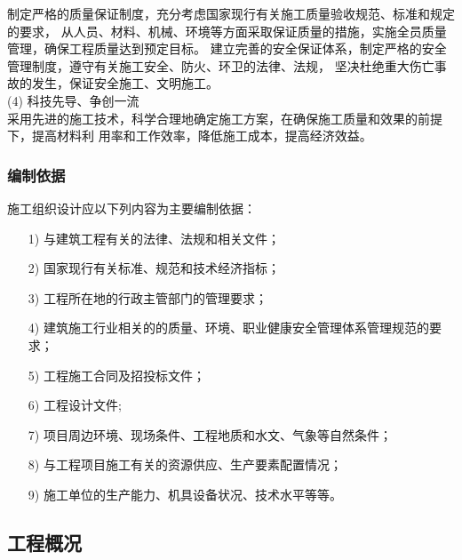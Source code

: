 制定严格的质量保证制度，充分考虑国家现行有关施工质量验收规范、标准和规定的要求，
从人员、材料、机械、环境等方面采取保证质量的措施，实施全员质量管理，确保工程质量达到预定目标。
建立完善的安全保证体系，制定严格的安全管理制度，遵守有关施工安全、防火、环卫的法律、法规，
坚决杜绝重大伤亡事故的发生，保证安全施工、文明施工。\\

(4) 科技先导、争创一流\\

采用先进的施工技术，科学合理地确定施工方案，在确保施工质量和效果的前提下，提高材料利
用率和工作效率，降低施工成本，提高经济效益。

\subsubsection{编制依据}

施工组织设计应以下列内容为主要编制依据：

\begin{itemize}

    \item [1)] 与建筑工程有关的法律、法规和相关文件；

    \item [2)] 国家现行有关标准、规范和技术经济指标；

    \item [3)] 工程所在地的行政主管部门的管理要求；

    \item [4)] 建筑施工行业相关的的质量、环境、职业健康安全管理体系管理规范的要求；

    \item [5)] 工程施工合同及招投标文件；

    \item [6)] 工程设计文件;

    \item [7)] 项目周边环境、现场条件、工程地质和水文、气象等自然条件；

    \item [8)] 与工程项目施工有关的资源供应、生产要素配置情况；

    \item [9)] 施工单位的生产能力、机具设备状况、技术水平等等。
    
\end{itemize}

\subsection{工程概况}

